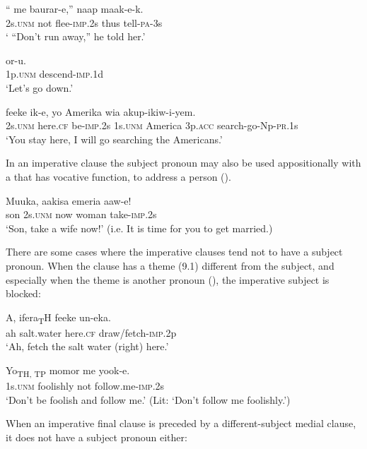 \ea%
\label{ex:x1771}
\gll `` me baurar-e,'' naap maak-e-k. \\
2s.\textsc{unm} not flee-\textsc{imp}.2s thus tell-\textsc{pa}-3s\\
\glt` ``Don't run away,'' he told her.'
\z

\ea%
\label{ex:x1772}
\gll {} or-u. \\
1p.\textsc{unm} descend-\textsc{imp}.1d\\
\glt`Let's go down.'
\z

\ea%
\label{ex:x1780}
\gll {} feeke ik-e, yo Amerika wia akup-ikiw-i-yem.\\
2s.\textsc{unm} here.\textsc{cf} be-\textsc{imp}.2s 1s.\textsc{unm} America 3p.\textsc{acc} search-go-Np-\textsc{pr}.1s\\
\glt`You stay here, I will go searching the Americans.'
\z

In an imperative clause the subject pronoun may also be used appositionally with a  that has vocative function, to address a person (). 

\ea%
\label{ex:x627}
\gll Muuka,  aakisa emeria aaw-e! \\
son 2s.\textsc{unm} now woman take-\textsc{imp}.2s\\
\glt`Son, take a wife now!' (i.e. It is time for you to get married.)
\z

There are some cases where the imperative clauses tend not to have a subject pronoun. When the clause has a theme (9.1) different from the subject, and especially when the theme is another pronoun (), the imperative subject is blocked:

\ea%
\label{ex:x1773}
\gll A, ifera\textsubscript{T}H feeke un-eka. \\
ah salt.water here.\textsc{cf} draw/fetch-\textsc{imp}.2p\\
\glt`Ah, fetch the salt water (right) here.'
\z

\ea%
\label{ex:x1774}
\gll Yo\textsubscript{TH, TP} momor me yook-e. \\
1s.\textsc{unm} foolishly not follow.me-\textsc{imp}.2s\\
\glt`Don't be foolish and follow me.' (Lit: `Don't follow me foolishly.')
\z

When an imperative final clause is preceded by a different-subject medial clause, it does not have a subject pronoun either:

